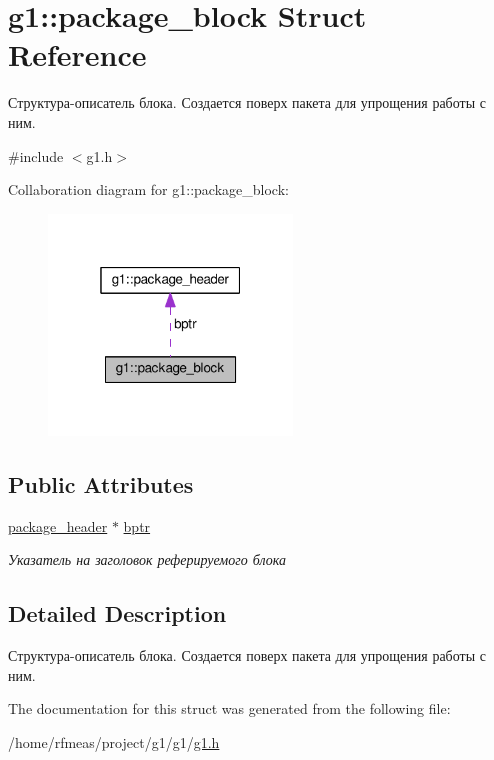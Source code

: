 \hypertarget{structg1_1_1package__block}{}\section{g1\+:\+:package\+\_\+block Struct Reference}
\label{structg1_1_1package__block}


Структура-\/описатель блока. Создается поверх пакета для упрощения работы с ним.  




{\ttfamily \#include $<$g1.\+h$>$}



Collaboration diagram for g1\+:\+:package\+\_\+block\+:
\nopagebreak
\begin{figure}[H]
\begin{center}
\leavevmode
\includegraphics[width=184pt]{structg1_1_1package__block__coll__graph}
\end{center}
\end{figure}
\subsection*{Public Attributes}
\begin{DoxyCompactItemize}
\item 
\hyperlink{structg1_1_1package__header}{package\+\_\+header} $\ast$ \hyperlink{structg1_1_1package__block_a4a5e269f8e769f8691c15aa56046eb79}{bptr}\hypertarget{structg1_1_1package__block_a4a5e269f8e769f8691c15aa56046eb79}{}\label{structg1_1_1package__block_a4a5e269f8e769f8691c15aa56046eb79}

\begin{DoxyCompactList}\small\item\em Указатель на заголовок реферируемого блока \end{DoxyCompactList}\end{DoxyCompactItemize}


\subsection{Detailed Description}
Структура-\/описатель блока. Создается поверх пакета для упрощения работы с ним. 

The documentation for this struct was generated from the following file\+:\begin{DoxyCompactItemize}
\item 
/home/rfmeas/project/g1/g1/\hyperlink{g1_8h}{g1.\+h}\end{DoxyCompactItemize}
